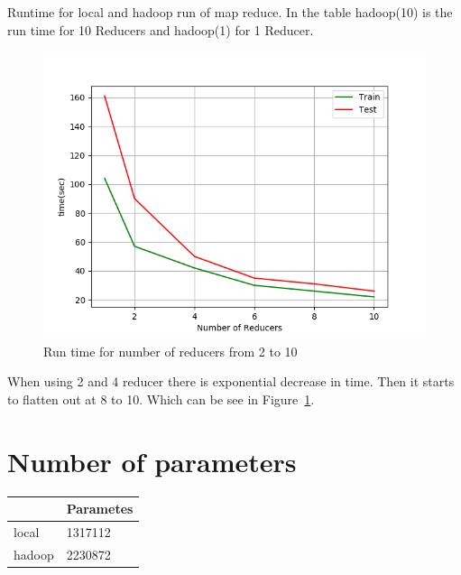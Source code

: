 \documentclass{article}
\begin{document}
Runtime for local and hadoop run of map reduce. In the table hadoop(10) is the run time for 10 Reducers and hadoop(1) for 1 Reducer.

\begin{figure}
\vskip 0.2in
\centerline{\includegraphics[width=\linewidth]{graph.png}}
\caption{Run time for number of reducers from 2 to 10}
\label{fig-graph}
\vskip -0.2in
\end{figure}

When using 2 and 4 reducer there is exponential decrease in time. Then it starts to flatten out at 8 to 10. Which can be see in  Figure~\ref{fig-graph}.


\section{Number of parameters}
\begin{center}
\begin{tabular}{ ll } 
 \hline
 \abovespace\belowspace
  & Parametes  \\ 
\hline
\abovespace
 local & 1317112 \\ 
\belowspace
 hadoop & 2230872 \\ 
 \hline
\end{tabular}
\end{center}



\nocite{website}



\end{document}
